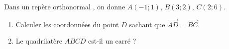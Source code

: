 
Dans un repère orthonormal \Oij , on donne $A (-1; 1)$, $B (3; 2)$, $C (2; 6)$.
\begin{enumerate}
\item Calculer les coordonnées du point $D$ sachant que  $\overrightarrow{AD} = \overrightarrow{BC}$.
\item Le quadrilatère $ABCD$ est-il un carré ?
\end{enumerate}

